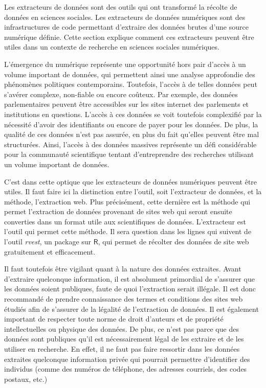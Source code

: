 \documentclass[
  letterpaper,
  DIV=11,
  numbers=noendperiod,
  oneside]{scrreprt}
\begin{document}
Les extracteurs de données sont des outils qui ont transformé la récolte
de données en sciences sociales. Les extracteurs de données numériques
sont des infrastructures de code permettant d'extraire des données
brutes d'une source numérique définie. Cette section explique comment
ces extracteurs peuvent être utiles dans un contexte de recherche en
sciences sociales numériques.

L'émergence du numérique représente une opportunité hors pair d'accès à
un volume important de données, qui permettent ainsi une analyse
approfondie des phénomènes politiques contemporains. Toutefois, l'accès
à de telles données peut s'avérer complexe, non-fiable ou encore
coûteux. Par exemple, des données parlementaires peuvent être
accessibles sur les sites internet des parlements et institutions en
questions. L'accès à ces données se voit toutefois complexifié par la
nécessité d'avoir des identifiants ou encore de payer pour les données.
De plus, la qualité de ces données n'est pas assurée, en plus du fait
qu'elles peuvent être mal structurées. Ainsi, l'accès à des données
massives représente un défi considérable pour la communauté scientifique
tentant d'entreprendre des recherches utilisant un volume important de
données.

C'est dans cette optique que les extracteurs de données numériques
peuvent être utiles. Il faut faire ici la distinction entre l'outil,
soit l'extracteur de données, et la méthode, l'extraction web. Plus
précisément, cette dernière est la méthode qui permet l'extraction de
données provenant de sites web qui seront ensuite converties dans un
format utile aux scientifiques de données. L'extracteur est l'outil qui
permet cette méthode. Il sera question dans les lignes qui suivent de
l'outil \emph{rvest}, un package sur \(\textsf{R}\), qui permet de
récolter des données de site web gratuitement et efficacement.

Il faut toutefois être vigilant quant à la nature des données extraites.
Avant d'extraire quelconque information, il est absolument primordial de
s'assurer que les données soient publiques, faute de quoi l'extraction
serait illégale. Il est donc recommandé de prendre connaissance des
termes et conditions des sites web étudiés afin de s'assurer de la
légalité de l'extraction de données. Il est également important de
respecter toute norme de droit d'auteurs et de propriété intellectuelles
ou physique des données. De plus, ce n'est pas parce que des données
sont publiques qu'il est nécessairement légal de les extraire et de les
utiliser en recherche. En effet, il ne faut pas faire ressortir dans les
données extraites quelconque information privée qui pourrait permettre
d'identifier des individus (comme des numéros de téléphone, des adresses
courriels, des codes postaux, etc.)
\end{document}
